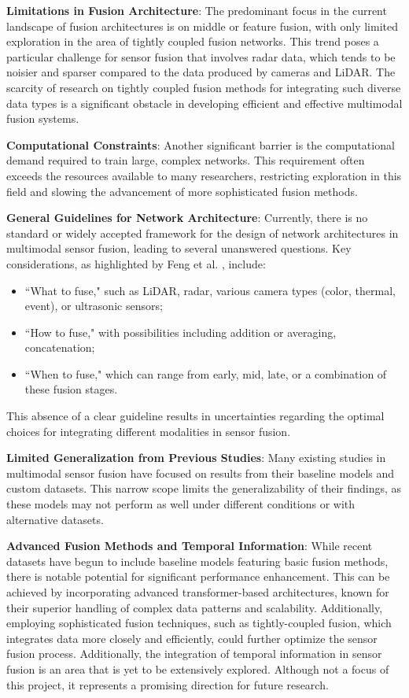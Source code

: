 \documentclass[report.tex]{subfiles}
\begin{document}
        \textbf{Limitations in Fusion Architecture}: The predominant focus in the current landscape of fusion architectures is on middle or feature fusion, with only limited exploration in the area of tightly coupled fusion networks. This trend poses a particular challenge for sensor fusion that involves radar data, which tends to be noisier and sparser compared to the data produced by cameras and LiDAR. The scarcity of research on tightly coupled fusion methods for integrating such diverse data types is a significant obstacle in developing efficient and effective multimodal fusion systems.

        \textbf{Computational Constraints}: Another significant barrier is the computational demand required to train large, complex networks. This requirement often exceeds the resources available to many researchers, restricting exploration in this field and slowing the advancement of more sophisticated fusion methods.

        \textbf{General Guidelines for Network Architecture}: Currently, there is no standard or widely accepted framework for the design of network architectures in multimodal sensor fusion, leading to several unanswered questions. Key considerations, as highlighted by Feng et al. \cite{feng2020deep}, include:
        \begin{itemize}
            \item ``What to fuse," such as LiDAR, radar, various camera types (color, thermal, event), or ultrasonic sensors;
            \item ``How to fuse," with possibilities including addition or averaging, concatenation;
            \item ``When to fuse," which can range from early, mid, late, or a combination of these fusion stages.
        \end{itemize}
        This absence of a clear guideline results in uncertainties regarding the optimal choices for integrating different modalities in sensor fusion.

        \textbf{Limited Generalization from Previous Studies}: Many existing studies in multimodal sensor fusion have focused on results from their baseline models and custom datasets. This narrow scope limits the generalizability of their findings, as these models may not perform as well under different conditions or with alternative datasets.

        \textbf{Advanced Fusion Methods and Temporal Information}: While recent datasets have begun to include baseline models featuring basic fusion methods, there is notable potential for significant performance enhancement. This can be achieved by incorporating advanced transformer-based architectures, known for their superior handling of complex data patterns and scalability. Additionally, employing sophisticated fusion techniques, such as tightly-coupled fusion, which integrates data more closely and efficiently, could further optimize the sensor fusion process. Additionally, the integration of temporal information in sensor fusion is an area that is yet to be extensively explored. Although not a focus of this project, it represents a promising direction for future research.
\end{document}
